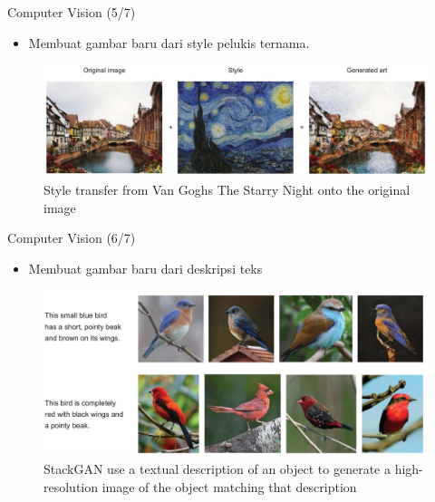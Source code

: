 \documentclass[pdf]{beamer}
\theoremstyle{mystyle}
\begin{document}
\begin{frame}{Computer Vision (5/7)}
	\begin{itemize}
		\item Membuat gambar baru dari style pelukis ternama.
	\end{itemize}	
\begin{figure}[!ht]
	\centering
\includegraphics[scale=.2]{images/generating-style}
\caption{Style transfer from Van Goghs The Starry Night onto the original image \citep{elgendy2020deeplearning4vision}}
\end{figure}		
\end{frame}

\begin{frame}{Computer Vision (6/7)}
	\begin{itemize}
		\item Membuat gambar baru dari deskripsi teks
	\end{itemize}
	\begin{figure}[!ht]
	\centering
	\includegraphics[scale=.225]{images/gans+text+cv.jpg}
	\caption{StackGAN use a textual description of an object to generate a high-resolution image of the object matching that description \citep{elgendy2020deeplearning4vision}}
\end{figure}		
\end{frame}
\end{document}
